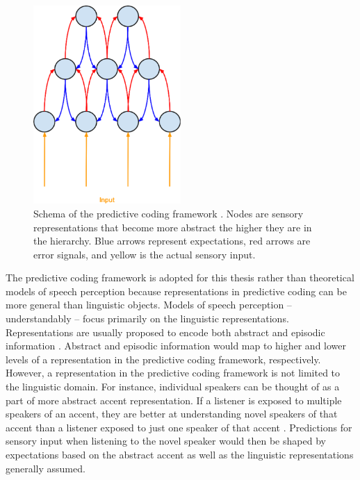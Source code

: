 \begin{figure}[!ht]
\caption{Schema of the predictive coding framework \citep{Clark2013}.  Nodes are sensory representations that become more abstract the higher they are in the hierarchy. Blue arrows represent expectations, red arrows are error signals, and yellow is the actual sensory input.}
\label{fig:predictivecoding}
\begin{center}
\includegraphics[width=0.5\textwidth]{pictures/predictive_coding}
\end{center}
\end{figure}

The predictive coding framework is adopted for this thesis rather than theoretical models of speech perception because representations in predictive coding can be more general than linguistic objects.
Models of speech perception -- understandably -- focus primarily on the linguistic representations.
Representations are usually proposed to encode both abstract and episodic information \citep[e.g.][]{McLennan2003}.
Abstract and episodic information would map to higher and lower levels of a representation in the predictive coding framework, respectively.
However, a representation in the predictive coding framework is not limited to the linguistic domain.
For instance, individual speakers can be thought of as a part of more abstract accent representation.
If a listener is exposed to multiple speakers of an accent, they are better at understanding novel speakers of that accent than a listener exposed to just one speaker of that accent \citep{Bradlow2008}.
Predictions for sensory input when listening to the novel speaker would then be shaped by expectations based on the abstract accent as well as the linguistic representations generally assumed.

